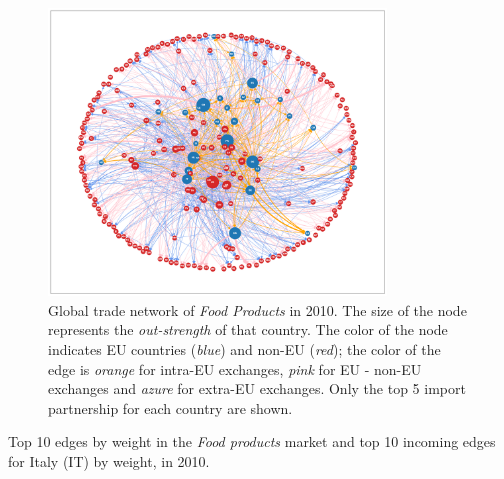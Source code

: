 \begin{figure}
    \centering
    \includegraphics[width=0.8\textwidth]{pics/full_y10_p10_force_116.png}
    \caption[Global trade network of \textit{Food Products} in 2010.]{Global trade network of \textit{Food Products} in 2010. The size of the node represents the \textit{out-strength} of that country. The color of the node indicates EU countries (\textit{blue}) and non-EU (\textit{red}); the color of the edge is \textit{orange} for intra-EU exchanges, \textit{pink} for EU - non-EU exchanges and \textit{azure} for extra-EU exchanges. Only the top 5 import partnership for each country are shown.}
    \label{fig:foodnetwork}
\end{figure}

\begin{table}
    \centering
    
    \caption{Top 10 edges by weight in the \textit{Food products} market and top 10 incoming edges for Italy (IT) by weight, in 2010.}
    \label{tab:top10foodimp}
\end{table}

